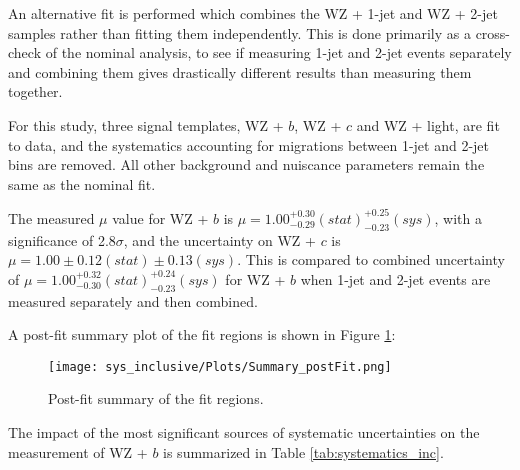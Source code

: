 
An alternative fit is performed which combines the WZ + 1-jet and WZ + 2-jet samples rather than fitting them independently. This is done primarily as a cross-check of the nominal analysis, to see if measuring 1-jet and 2-jet events separately and combining them gives drastically different results than measuring them together. 

For this study, three signal templates, WZ + $b$, WZ + $c$ and WZ + light, are fit to data, and the systematics accounting for migrations between 1-jet and 2-jet bins are removed. All other background and nuiscance parameters remain the same as the nominal fit. 

The measured $\mu$ value for WZ + $b$ is  $\mu = 1.00^{+0.30}_{-0.29}(stat)^{+0.25}_{-0.23}(sys)$, with a significance of 2.8$\sigma$, and the uncertainty on WZ + $c$ is $\mu = 1.00\pm 0.12 (stat)\pm 0.13 (sys)$. This is compared to combined uncertainty of $\mu = 1.00^{+0.32}_{-0.30}(stat)^{+0.24}_{-0.23}(sys)$ for WZ + $b$ when 1-jet and 2-jet events are measured separately and then combined.

A post-fit summary plot of the fit regions is shown in Figure \ref{fig:fit_results_inc}: 

\begin{figure}[H]
    \center
    \texttt{[image: sys\_inclusive/Plots/Summary\_postFit.png]}
    \caption{Post-fit summary of the fit regions.}
    \label{fig:fit_results_inc}
\end{figure}

The impact of the most significant sources of systematic uncertainties on the measurement of WZ + $b$ is summarized in Table \ref{tab:systematics_inc}. 

